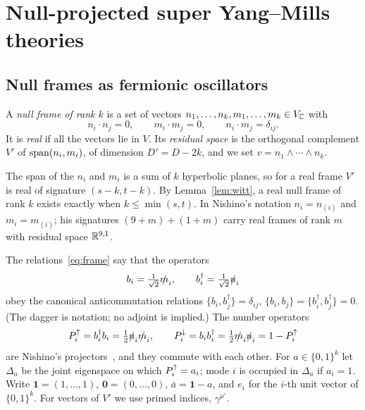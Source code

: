 \section{Null-projected super Yang--Mills theories}
\label{sec:null}

\subsection{Null frames as fermionic oscillators}

\begin{definition}
\label{def:frame}
A \emph{null frame of rank $k$} is a set of vectors $n_1,\dots,n_k,\allowbreak m_1,\dots,m_k\in V_{\mathbb{C}}$ with
\begin{equation}
\label{eq:frame}
n_i\cdot n_j=0,\qquad m_i\cdot m_j=0,\qquad n_i\cdot m_j=\delta_{ij}.
\end{equation}
It is \emph{real} if all the vectors lie in $V$. Its \emph{residual space} is the orthogonal complement $V'$ of $\operatorname{span}(n_i,m_i)$, of dimension $D'=D-2k$, and we set $v=n_1\wedge\cdots\wedge n_k$.
\end{definition}

The span of the $n_i$ and $m_i$ is a sum of $k$ hyperbolic planes, so for a real frame $V'$ is real of signature $(s-k,t-k)$. By Lemma~\ref{lem:witt}, a real null frame of rank $k$ exists exactly when $k\le\min(s,t)$. In Nishino's notation $n_i=n_{(i)}$ and $m_i=m_{(i)}$; his signatures $(9+m)+(1+m)$ carry real frames of rank $m$ with residual space $\mathbb{R}^{9,1}$.

The relations~\eqref{eq:frame} say that the operators
\begin{equation}
\label{eq:osc}
b_i=\tfrac{1}{\sqrt2}\slashed{m}_i,\qquad b_i^\dagger=\tfrac{1}{\sqrt2}\slashed{n}_i
\end{equation}
obey the canonical anticommutation relations $\{b_i,b_j^\dagger\}=\delta_{ij}$, $\{b_i,b_j\}=\{b_i^\dagger,b_j^\dagger\}=0$. (The dagger is notation; no adjoint is implied.) The number operators
\begin{equation}
\label{eq:proj}
P^{\uparrow}_i=b_i^\dagger b_i=\tfrac12\slashed{n}_i\slashed{m}_i,\qquad P^{\downarrow}_i=b_ib_i^\dagger=\tfrac12\slashed{m}_i\slashed{n}_i=1-P^{\uparrow}_i
\end{equation}
are Nishino's projectors~\cite{Nishino1998}, and they commute with each other. For $a\in\{0,1\}^k$ let $\Delta_a$ be the joint eigenspace on which $P^{\uparrow}_i=a_i$; mode $i$ is occupied in $\Delta_a$ if $a_i=1$. Write $\mathbf 1=(1,\dots,1)$, $\mathbf 0=(0,\dots,0)$, $\bar a=\mathbf 1-a$, and $e_i$ for the $i$-th unit vector of $\{0,1\}^k$. For vectors of $V'$ we use primed indices, $\gamma^{\mu'}$.

